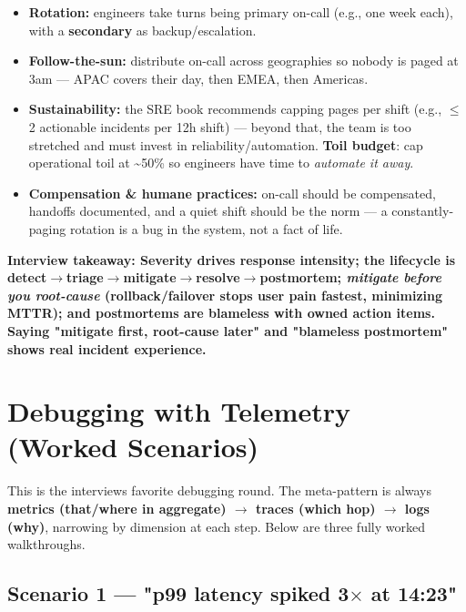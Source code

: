 \documentclass[11pt]{article}
\providecommand{\tightlist}{\setlength{\itemsep}{1pt}\setlength{\parskip}{0pt}}
\begin{document}
\begin{itemize}
\tightlist
\item
  \textbf{Rotation:} engineers take turns being primary on-call (e.g., one week each), with a \textbf{secondary} as backup/escalation.
\item
  \textbf{Follow-the-sun:} distribute on-call across geographies so nobody is paged at 3am --- APAC covers their day, then EMEA, then Americas.
\item
  \textbf{Sustainability:} the SRE book recommends capping pages per shift (e.g., \(\leq\)2 actionable incidents per 12h shift) --- beyond that, the team is too stretched and must invest in reliability/automation. \textbf{Toil budget}: cap operational toil at \textasciitilde50\% so engineers have time to \emph{automate it away}.
\item
  \textbf{Compensation \& humane practices:} on-call should be compensated, handoffs documented, and a quiet shift should be the norm --- a constantly-paging rotation is a bug in the system, not a fact of life.
\end{itemize}

\textbf{Interview takeaway: Severity drives response intensity; the lifecycle is detect\(\rightarrow\)triage\(\rightarrow\)mitigate\(\rightarrow\)resolve\(\rightarrow\)postmortem; \emph{mitigate before you root-cause} (rollback/failover stops user pain fastest, minimizing MTTR); and postmortems are blameless with owned action items. Saying "mitigate first, root-cause later" and "blameless postmortem" shows real incident experience.}

\section{Debugging with Telemetry (Worked Scenarios)}\label{debugging-with-telemetry-worked-scenarios}

This is the interview\textquotesingle s favorite debugging round. The meta-pattern is always \textbf{metrics (that/where in aggregate) \(\rightarrow\) traces (which hop) \(\rightarrow\) logs (why)}, narrowing by dimension at each step. Below are three fully worked walkthroughs.

\subsection{\texorpdfstring{Scenario 1 --- "p99 latency spiked 3\(\times\) at 14:23"}{Scenario 1 --- "p99 latency spiked 3\textbackslash times at 14:23"}}\label{scenario-1--p99-latency-spiked-3times-at-1423}
\end{document}
